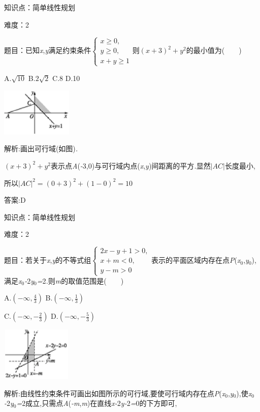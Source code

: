 \documentclass{article} %
\begin{document}
知识点：简单线性规划

难度：2

题目：已知\textit{x},\textit{y}满足约束条件$
\begin{cases}
x\ge 0,\\
y \ge 0,\\
x+y \ge 1
\end{cases}$则${(x+3)}^2+y^2$的最小值为(\textit{　　})

 A.$\sqrt{10}$ B.$2\sqrt{2}$ C.8 D.10

 \includegraphics*[width=1.33in, height=0.90in, keepaspectratio=false]{image1642}

 解析:画出可行域(如图)\textit{.}

${(x+3)}^2+y^2$表示点\textit{A}(\textit{-}3,0)与可行域内点(\textit{x},\textit{y})间距离的平方\textit{.}显然$|AC|$长度最小,

所以${|AC|}^2={(0+3)}^2+{(1-0)}^2=10$

 答案:D

知识点：简单线性规划

难度：2

题目：若关于\textit{x},\textit{y}的不等式组$
\begin{cases}
2x-y+1 >0,\\
x+m<0,\\
y-m>0
\end{cases}$表示的平面区域内存在点\textit{P}(\textit{x}${}_{0}$,\textit{y}${}_{0}$),满足\textit{x}${}_{0}$\textit{-}2\textit{y}${}_{0}$\textit{=}2\textit{.}则\textit{m}的取值范围是(\textit{　　})

 A.$(-\infty,\frac{4}{3})$ B.$(-\infty,\frac{1}{3})$

 C.$(-\infty,-\frac{2}{3})$ D.$(-\infty,-\frac{5}{3})$

 \includegraphics*[width=1.33in, height=1.01in, keepaspectratio=false]{image1648}

 解析:由线性约束条件可画出如图所示的可行域,要使可行域内存在点\textit{P}(\textit{x}${}_{0}$,\textit{y}${}_{0}$),使\textit{x}${}_{0}$\textit{-}2\textit{y}${}_{0}$\textit{=}2成立,只需点\textit{A}(\textit{-m},\textit{m})在直线\textit{x-}2\textit{y-}2\textit{=}0的下方即可,
\end{document}
